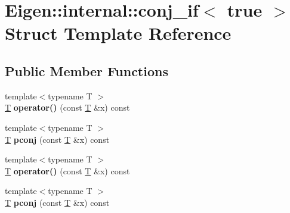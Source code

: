 \hypertarget{struct_eigen_1_1internal_1_1conj__if_3_01true_01_4}{}\section{Eigen\+:\+:internal\+:\+:conj\+\_\+if$<$ true $>$ Struct Template Reference}
\label{struct_eigen_1_1internal_1_1conj__if_3_01true_01_4}
\subsection*{Public Member Functions}
\begin{DoxyCompactItemize}
\item 
\mbox{\label{struct_eigen_1_1internal_1_1conj__if_3_01true_01_4_ac702d64c1cc0b8a4b2eebeafd57c473f}} 
{\footnotesize template$<$typename T $>$ }\\\hyperlink{group___sparse_core___module}{T} {\bfseries operator()} (const \hyperlink{group___sparse_core___module}{T} \&x) const
\item 
\mbox{\label{struct_eigen_1_1internal_1_1conj__if_3_01true_01_4_a4dd4359e90b3e47f301e3cc517548ed5}} 
{\footnotesize template$<$typename T $>$ }\\\hyperlink{group___sparse_core___module}{T} {\bfseries pconj} (const \hyperlink{group___sparse_core___module}{T} \&x) const
\item 
\mbox{\label{struct_eigen_1_1internal_1_1conj__if_3_01true_01_4_ac702d64c1cc0b8a4b2eebeafd57c473f}} 
{\footnotesize template$<$typename T $>$ }\\\hyperlink{group___sparse_core___module}{T} {\bfseries operator()} (const \hyperlink{group___sparse_core___module}{T} \&x) const
\item 
\mbox{\label{struct_eigen_1_1internal_1_1conj__if_3_01true_01_4_a4dd4359e90b3e47f301e3cc517548ed5}} 
{\footnotesize template$<$typename T $>$ }\\\hyperlink{group___sparse_core___module}{T} {\bfseries pconj} (const \hyperlink{group___sparse_core___module}{T} \&x) const
\end{DoxyCompactItemize}


